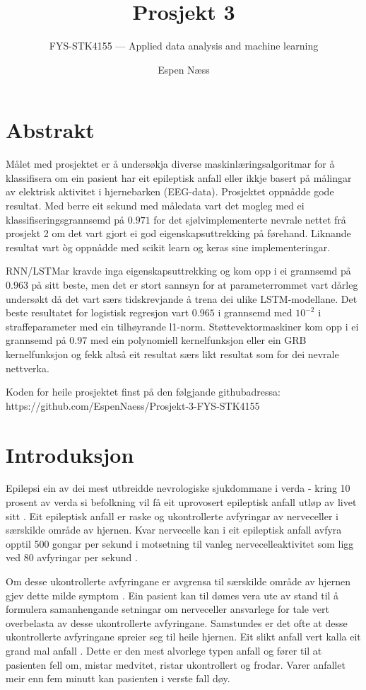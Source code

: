 \documentclass[oneside, nynorsk]{book}
\title{Prosjekt 3}        %
\subtitle{FYS-STK4155 --- Applied data analysis and machine learning}         %
\author{Espen Næss}                      %
\begin{document}
\let\cleardoublepage\clearpage
\ififorside{}
\let\cleardoublepage\clearpage
\chapter*{Abstrakt}                   %
Målet med prosjektet er å undersøkja diverse maskinlæringsalgoritmar for å klassifisera om ein pasient har eit epileptisk anfall eller ikkje
basert på målingar av elektrisk aktivitet i hjernebarken (EEG-data).
Prosjektet oppnådde gode resultat. Med berre eit sekund med måledata vart det mogleg med
ei klassifiseringsgrannsemd på $0.971$ for det sjølvimplementerte nevrale nettet frå prosjekt 2 om det vart gjort ei god eigenskapsuttrekking på førehand. Liknande resultat vart òg oppnådde med scikit learn og keras sine implementeringar.

RNN/LSTMar kravde inga eigenskapsuttrekking og kom opp i ei grannsemd på $0.963$ på sitt beste,
men det er stort sannsyn for at parameterrommet vart dårleg undersøkt då det vart særs tidskrevjande å trena dei ulike LSTM-modellane.
Det beste resultatet for logistisk regresjon vart $0.965$ i grannsemd med $10^{-2}$ i straffeparameter med ein tilhøyrande l1-norm.
Støttevektormaskiner kom opp i ei grannsemd på $0.97$ med ein polynomiell kernelfunksjon eller ein GRB kernelfunksjon og fekk altså eit resultat særs likt resultat som for dei nevrale nettverka.

Koden for heile prosjektet finst på den følgjande githubadressa: \\
https://github.com/EspenNaess/Prosjekt-3-FYS-STK4155
\tableofcontents{}
\mainmatter{}
\chapter{Introduksjon}                    %
Epilepsi ein av dei mest utbreidde nevrologiske sjukdommane i verda - kring 10 prosent av verda si befolkning
vil få eit uprovosert epileptisk anfall utløp av livet sitt \cite{Epil}.
Eit epileptisk anfall er raske og ukontrollerte avfyringar av nerveceller i særskilde område av hjernen.
Kvar nervecelle kan i eit epileptisk anfall avfyra opptil 500 gongar per sekund
i motsetning til vanleg nervecelleaktivitet som ligg ved 80 avfyringar per sekund \cite{Epil2}.

Om desse ukontrollerte avfyringane er avgrensa til særskilde område av hjernen gjev dette milde symptom \cite{Epil3}.
Ein pasient kan til dømes vera ute av stand til å formulera samanhengande setningar om nerveceller ansvarlege for tale vert overbelasta av desse ukontrollerte avfyringane.
Samstundes er det ofte at desse ukontrollerte avfyringane spreier seg til heile hjernen.
Eit slikt anfall vert kalla eit grand mal anfall \cite{Epil3}.
Dette er den mest alvorlege typen anfall og fører til at pasienten fell om, mistar medvitet, ristar ukontrollert og frodar.
Varer anfallet meir enn fem minutt kan pasienten i verste fall døy.
\end{document}
